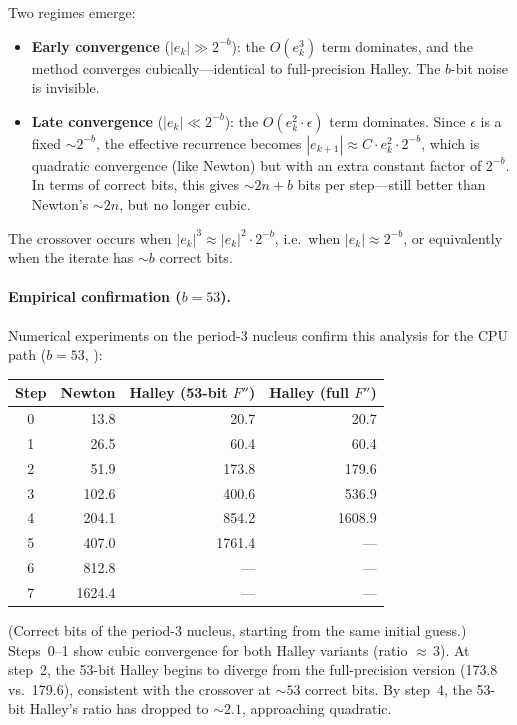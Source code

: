 Two regimes emerge:
\begin{itemize}
\item \textbf{Early convergence} ($|e_k| \gg 2^{-b}$): the $O(e_k^3)$ term
  dominates, and the method converges cubically---identical to full-precision
  Halley.  The $b$-bit noise is invisible.
\item \textbf{Late convergence} ($|e_k| \ll 2^{-b}$): the
  $O(e_k^2 \cdot \epsilon)$ term dominates.  Since $\epsilon$ is a fixed
  ${\sim}2^{-b}$, the effective recurrence becomes $|e_{k+1}| \approx
  C \cdot e_k^2 \cdot 2^{-b}$, which is quadratic convergence (like Newton)
  but with an extra constant factor of $2^{-b}$.  In terms of correct bits,
  this gives ${\sim}2n + b$ bits per step---still better than Newton's
  ${\sim}2n$, but no longer cubic.
\end{itemize}

The crossover occurs when $|e_k|^3 \approx |e_k|^2 \cdot 2^{-b}$,
i.e.\ when $|e_k| \approx 2^{-b}$, or equivalently when the iterate has
${\sim}b$ correct bits.

\paragraph{Empirical confirmation ($b = 53$).}
Numerical experiments on the period-3 nucleus confirm this analysis
for the CPU path ($b = 53$, ):

\begin{center}
\begin{tabular}{crrr}
\hline
\textbf{Step} & \textbf{Newton} & \textbf{Halley (53-bit $F''$)}
              & \textbf{Halley (full $F''$)} \\
\hline
0 &  13.8 &  20.7 &  20.7 \\
1 &  26.5 &  60.4 &  60.4 \\
2 &  51.9 & 173.8 & 179.6 \\
3 & 102.6 & 400.6 & 536.9 \\
4 & 204.1 & 854.2 & 1608.9 \\
5 & 407.0 & 1761.4 & --- \\
6 & 812.8 & --- & --- \\
7 & 1624.4 & --- & --- \\
\hline
\end{tabular}
\end{center}

(Correct bits of the period-3 nucleus, starting from the same initial guess.)
Steps~0--1 show cubic convergence for both Halley variants (ratio
${\approx}\,3$). At step~2, the 53-bit Halley begins to diverge from the
full-precision version (173.8 vs.\ 179.6), consistent with the crossover at
${\sim}53$ correct bits.  By step~4, the 53-bit Halley's ratio has dropped to
${\sim}2.1$, approaching quadratic.

